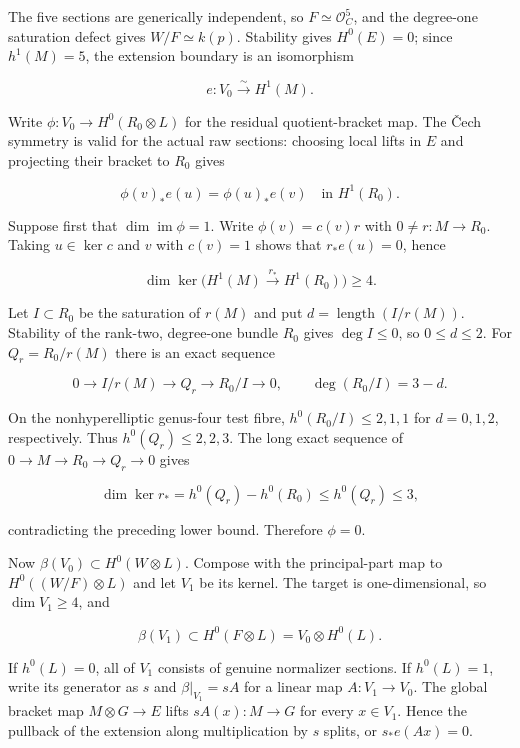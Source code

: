\documentclass[11pt]{article}
\theoremstyle{definition}
\begin{document}
The five sections are generically independent, so
\(F\simeq\mathcal O_C^5\), and the degree-one saturation defect gives
\(W/F\simeq k(p)\). Stability gives \(H^0(E)=0\); since \(h^1(M)=5\),
the extension boundary is an isomorphism

\[e:V_0\xrightarrow{\sim}H^1(M).\]

Write \(\phi:V_0\to H^0(R_0\otimes L)\) for the residual
quotient-bracket map. The \v{C}ech symmetry is valid for the actual raw
sections: choosing local lifts in \(E\) and projecting their bracket to
\(R_0\) gives

\[\phi(v)_*e(u)=\phi(u)_*e(v)
\quad\text{in }H^1(R_0).\]

Suppose first that \(\dim\operatorname{im}\phi=1\). Write
\(\phi(v)=c(v)r\) with \(0\ne r:M\to R_0\). Taking \(u\in\ker c\) and
\(v\) with \(c(v)=1\) shows that \(r_*e(u)=0\), hence

\[\dim\ker\bigl(H^1(M)\xrightarrow{r_*}H^1(R_0)\bigr)\ge4.\]

Let \(I\subset R_0\) be the saturation of \(r(M)\) and put
\(d=\operatorname{length}(I/r(M))\). Stability of the rank-two,
degree-one bundle \(R_0\) gives \(\deg I\le0\), so \(0\le d\le2\). For
\(Q_r=R_0/r(M)\) there is an exact sequence

\[0\longrightarrow I/r(M)\longrightarrow Q_r
\longrightarrow R_0/I\longrightarrow0,
\qquad \deg(R_0/I)=3-d.\]

On the nonhyperelliptic genus-four test fibre, \(h^0(R_0/I)\le2,1,1\)
for \(d=0,1,2\), respectively. Thus \(h^0(Q_r)\le2,2,3\). The long exact
sequence of \(0\to M\to R_0\to Q_r\to0\) gives

\[\dim\ker r_*=h^0(Q_r)-h^0(R_0)\le h^0(Q_r)\le3,\]

contradicting the preceding lower bound. Therefore \(\phi=0\).

Now \(\beta(V_0)\subset H^0(W\otimes L)\). Compose with the
principal-part map to \(H^0((W/F)\otimes L)\) and let \(V_1\) be its
kernel. The target is one-dimensional, so \(\dim V_1\ge4\), and

\[\beta(V_1)\subset H^0(F\otimes L)
=V_0\otimes H^0(L).\]

If \(h^0(L)=0\), all of \(V_1\) consists of genuine normalizer sections.
If \(h^0(L)=1\), write its generator as \(s\) and \(\beta|_{V_1}=sA\)
for a linear map \(A:V_1\to V_0\). The global bracket map
\(M\otimes G\to E\) lifts \(sA(x):M\to G\) for every \(x\in V_1\). Hence
the pullback of the extension along multiplication by \(s\) splits, or
\(s_*e(Ax)=0\).
\end{document}
